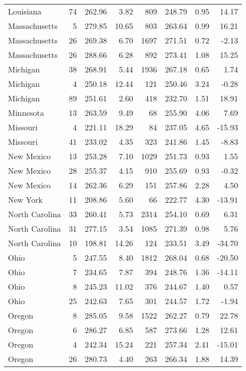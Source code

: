 \begin{longtable}{lrrr@{\extracolsep{10pt}}rrrr}
  Louisiana &  74 & 262.96 & 3.82 & 809 & 248.79 & 0.95 & 14.17 \\ 
  Massachusetts &   5 & 279.85 & 10.65 & 803 & 263.64 & 0.99 & 16.21 \\ 
  Massachusetts &  26 & 269.38 & 6.70 & 1697 & 271.51 & 0.72 & -2.13 \\ 
  Massachusetts &  26 & 288.66 & 6.28 & 892 & 273.41 & 1.08 & 15.25 \\ 
  Michigan &  38 & 268.91 & 5.44 & 1936 & 267.18 & 0.65 & 1.74 \\ 
  Michigan &   4 & 250.18 & 12.44 & 121 & 250.46 & 3.24 & -0.28 \\ 
  Michigan &  89 & 251.61 & 2.60 & 418 & 232.70 & 1.51 & 18.91 \\ 
  Minnesota &  13 & 263.59 & 9.49 &  68 & 255.90 & 4.06 & 7.69 \\ 
  Missouri &   4 & 221.11 & 18.29 &  84 & 237.05 & 4.65 & -15.93 \\ 
  Missouri &  41 & 233.02 & 4.35 & 323 & 241.86 & 1.45 & -8.83 \\ 
  New Mexico &  13 & 253.28 & 7.10 & 1029 & 251.73 & 0.93 & 1.55 \\ 
  New Mexico &  28 & 255.37 & 4.15 & 910 & 255.69 & 0.93 & -0.32 \\ 
  New Mexico &  14 & 262.36 & 6.29 & 151 & 257.86 & 2.28 & 4.50 \\ 
  New York &  11 & 208.86 & 5.60 &  66 & 222.77 & 4.30 & -13.91 \\ 
  North Carolina &  33 & 260.41 & 5.73 & 2314 & 254.10 & 0.69 & 6.31 \\ 
  North Carolina &  31 & 277.15 & 3.54 & 1085 & 271.39 & 0.98 & 5.76 \\ 
  North Carolina &  10 & 198.81 & 14.26 & 124 & 233.51 & 3.49 & -34.70 \\ 
  Ohio &   5 & 247.55 & 8.40 & 1812 & 268.04 & 0.68 & -20.50 \\ 
  Ohio &   7 & 234.65 & 7.87 & 394 & 248.76 & 1.36 & -14.11 \\ 
  Ohio &   8 & 245.23 & 11.02 & 376 & 244.67 & 1.40 & 0.57 \\ 
  Ohio &  25 & 242.63 & 7.65 & 301 & 244.57 & 1.72 & -1.94 \\ 
  Oregon &   8 & 285.05 & 9.58 & 1522 & 262.27 & 0.79 & 22.78 \\ 
  Oregon &   6 & 286.27 & 6.85 & 587 & 273.66 & 1.28 & 12.61 \\ 
  Oregon &   4 & 242.34 & 15.24 & 221 & 257.34 & 2.41 & -15.01 \\ 
  Oregon &  26 & 280.73 & 4.40 & 263 & 266.34 & 1.88 & 14.39 \\ 

\end{longtable}

